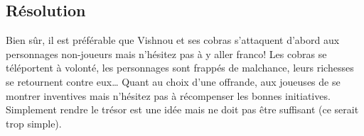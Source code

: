 \subsection{Résolution}

Bien sûr, il est préférable que Vishnou et ses cobras s'attaquent d'abord aux personnages non-joueurs mais n'hésitez pas à y aller franco!
Les cobras se téléportent à volonté, les personnages sont frappés de malchance, leurs richesses se retournent contre eux\dots
Quant au choix d'une offrande, aux joueuses de se montrer inventives mais n'hésitez pas à récompenser les bonnes initiatives.
Simplement \og rendre \fg le trésor est une idée mais ne doit pas être suffisant (ce serait trop simple).
